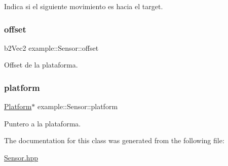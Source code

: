 Indica si el siguiente movimiento es hacia el target. 

\mbox{\label{classexample_1_1_sensor_a7cabbf4676f11e6cf6059ef84b4dc1e9}} 
\subsubsection{\texorpdfstring{offset}{offset}}
{\footnotesize\ttfamily b2\+Vec2 example\+::\+Sensor\+::offset\hspace{0.3cm}{\ttfamily [protected]}}



Offset de la plataforma. 

\mbox{\label{classexample_1_1_sensor_afb349009afdce990f4ce4728634e7b58}} 
\subsubsection{\texorpdfstring{platform}{platform}}
{\footnotesize\ttfamily \mbox{\hyperlink{classexample_1_1_platform}{Platform}}$\ast$ example\+::\+Sensor\+::platform\hspace{0.3cm}{\ttfamily [protected]}}



Puntero a la plataforma. 



The documentation for this class was generated from the following file\+:\begin{DoxyCompactItemize}
\item 
\mbox{\hyperlink{_sensor_8hpp}{Sensor.\+hpp}}\end{DoxyCompactItemize}
